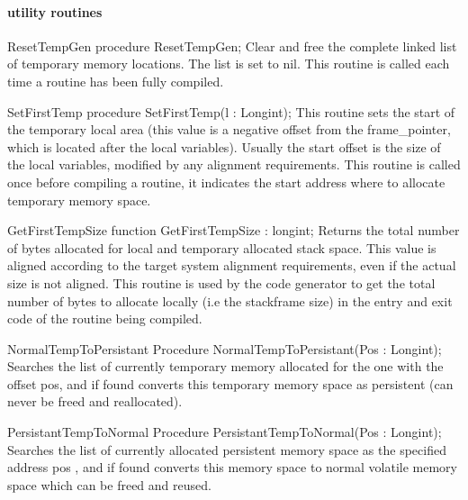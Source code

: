 \documentclass [12pt]{article}
\begin{document}
\paragraph{utility routines}

\begin{procedure}{ResetTempGen}
\Declaration
procedure ResetTempGen;
\Description 
Clear and free the complete linked list of temporary memory locations. The
list is set to nil. 
\Notes 
This routine is called each time a routine has been fully compiled. 
\end{procedure}

\begin{procedure}{SetFirstTemp}
\Declaration
procedure SetFirstTemp(l : Longint);
\Description 
This routine sets the start of the temporary local area (this value is a
negative offset from the frame{\_}pointer, which is located after the local
variables). Usually the start offset is the size of the local variables,
modified by any alignment requirements. 
\Notes 
This routine is called once before compiling a routine, it indicates the
start address where to allocate temporary memory space. 
\end{procedure}

\begin{function}{GetFirstTempSize}
\Declaration
function GetFirstTempSize : longint;
\Description 
Returns the total number of bytes allocated for local and temporary
allocated stack space. This value is aligned according to the target system
alignment requirements, even if the actual size is not aligned. 
\Notes 
This routine is used by the code generator to get the total number of bytes
to allocate locally (i.e the stackframe size) in the entry and exit code of
the routine being compiled. 
\end{function}

\begin{function}{NormalTempToPersistant}
\Declaration
Procedure NormalTempToPersistant(Pos : Longint);
\Description
Searches the list of currently temporary memory allocated for the one with
the offset \textsf{pos, }and if found converts this temporary memory space
as persistent (can never be freed and reallocated). 
\end{function}

\begin{function}{PersistantTempToNormal}
\Declaration
Procedure PersistantTempToNormal(Pos : Longint);
\Description 
Searches the list of currently allocated persistent memory space as the
specified address \textsf{pos }, and if found converts this memory space to
normal volatile memory space which can be freed and reused. 
\end{function}
\end{document}
